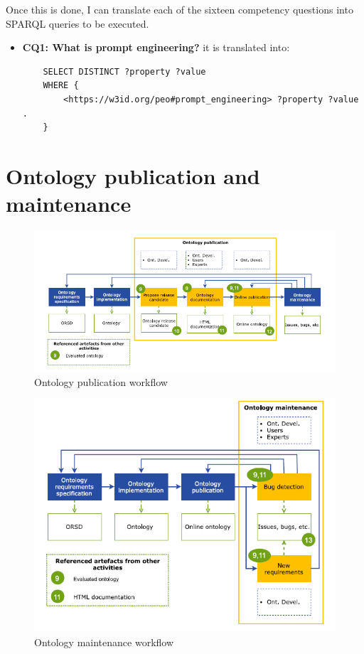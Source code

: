 Once this is done, I can translate each of the sixteen competency questions into SPARQL queries to be executed.\\
\begin{itemize}
    \item \textbf{CQ1: What is prompt engineering?} it is translated into:
    \begin{lstlisting}
    SELECT DISTINCT ?property ?value
    WHERE {
        <https://w3id.org/peo#prompt_engineering> ?property ?value .
    }
    \end{lstlisting}
    
\end{itemize}

\newpage
\section{Ontology publication and maintenance}
\begin{figure}[H]
    \centering
    \includegraphics[width=0.9\linewidth]{Figures/fig_25.png}
    \caption{Ontology publication workflow}
    \label{fig:enter-label}
\end{figure}

\begin{figure}[H]
    \centering
    \includegraphics[width=0.9\linewidth]{Figures/fig_33.png}
    \caption{Ontology maintenance workflow}
    \label{fig:enter-label}
\end{figure}



